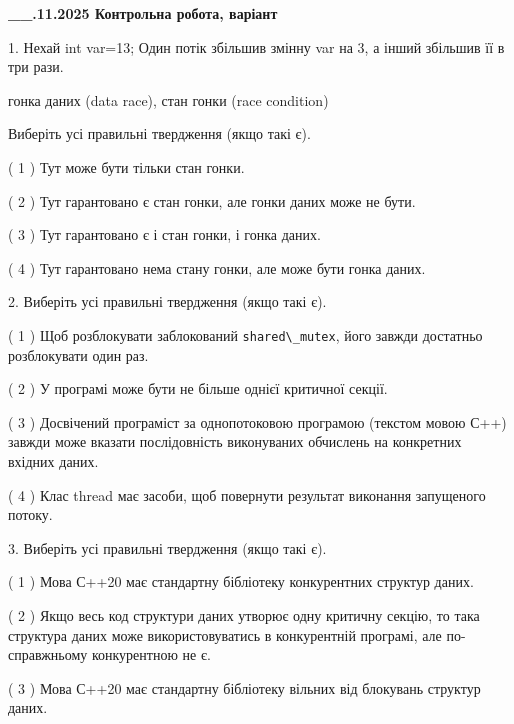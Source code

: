 \documentclass[12pt, ukrainian]{article}
\def\code#1{\Verb!#1!}
\begin{document}
\newpage
\begin {large}

\textbf{\_\_.11.2025 Контрольна робота, варіант  }\par


{
1. Нехай int var=13; Один потік збільшив змінну var на 3, а інший збільшив її в три рази.

гонка даних (data race), стан гонки (race condition)

Виберіть усі правильні твердження (якщо такі є).\par
\vspace{2mm}
( 1 ) Тут може бути тільки стан гонки.%

( 2 ) Тут гарантовано є стан гонки, але гонки даних може не бути.%

( 3 ) Тут гарантовано є і стан гонки, і гонка даних.%

( 4 ) Тут гарантовано нема стану гонки, але може бути гонка даних.%


2. Виберіть усі правильні твердження (якщо такі є).\par
\vspace{2mm}

( 1 ) Щоб розблокувати заблокований \code{shared\_mutex}, його завжди достатньо розблокувати один раз.%

( 2 ) У програмі може бути не більше однієї критичної секції.%

( 3 ) Досвічений програміст за однопотоковою програмою (текстом мовою С++) завжди може вказати послідовність виконуваних обчислень на конкретних вхідних даних.%

( 4 ) Клас thread має засоби, щоб повернути результат виконання запущеного потоку.%


3. Виберіть усі правильні твердження (якщо такі є).\par
\vspace{2mm}

( 1 ) Мова С++20 має стандартну бібліотеку конкурентних структур даних.%

( 2 ) Якщо весь код структури даних утворює одну критичну секцію, то така структура даних може використовуватись в конкурентній програмі, але по-справжньо\-му конкурентною не є.%

( 3 ) Мова С++20 має стандартну бібліотеку вільних від блокувань структур даних.%

}
\end{large}
\end{document}
